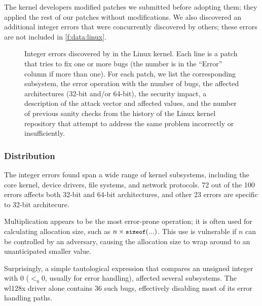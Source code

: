 The kernel developers modified \nrpatchesmod patches we submitted
before adopting them; they applied the rest of our patches without
modifications.
%
We also discovered an additional \nrbugsbyothers integer errors that
were concurrently discovered by others; these errors are not included
in \autoref{f:data:linux}.

\begin{figure*}
\centering
\footnotesize

\caption{Integer errors discovered by \sys in the Linux
kernel.  Each line is a patch that tries to fix one
or more bugs (the number is in the ``Error'' column if more than
one).  For each patch, we list the corresponding subsystem, the
error operation with the number of bugs, the affected architectures
(32-bit and/or 64-bit), the security impact, a
description of the attack vector and affected values, and
the number of previous sanity checks from the history of the 
Linux kernel repository that attempt to address the same problem
incorrectly or insufficiently. }
\label{f:data:linux}
\end{figure*}

\subsubsection{Distribution}

The integer errors \sys found span a wide range of kernel subsystems,
including the core kernel, device drivers, file systems, and network
protocols.
72 out of the 100 errors affects both 32-bit and 64-bit architectures,
and other 23 errors are specific to 32-bit architecure.

Multiplication appears to be the most error-prone operation; it is
often used for calculating allocation size, such as $n \times
\cc{sizeof}(...)$.  This use is vulnerable if $n$ can be controlled
by an adversary, causing the allocation size to wrap around to an
unanticipated smaller value.

Surprisingly,  a simple tautological expression that 
compares an unsigned integer with 0 ($<_u 0$, usually for error handling),
affected several subsystems.
The wl128x driver alone contains 36 such bugs, effectively
disabling most of its error handling paths.

